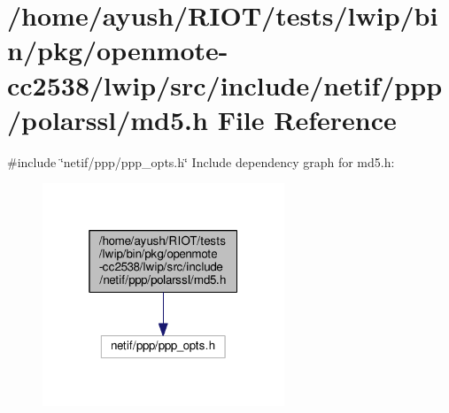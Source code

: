 \hypertarget{openmote-cc2538_2lwip_2src_2include_2netif_2ppp_2polarssl_2md5_8h}{}\section{/home/ayush/\+R\+I\+O\+T/tests/lwip/bin/pkg/openmote-\/cc2538/lwip/src/include/netif/ppp/polarssl/md5.h File Reference}
\label{openmote-cc2538_2lwip_2src_2include_2netif_2ppp_2polarssl_2md5_8h}
{\ttfamily \#include \char`\"{}netif/ppp/ppp\+\_\+opts.\+h\char`\"{}}\newline
Include dependency graph for md5.\+h\+:
\nopagebreak
\begin{figure}[H]
\begin{center}
\leavevmode
\includegraphics[width=205pt]{openmote-cc2538_2lwip_2src_2include_2netif_2ppp_2polarssl_2md5_8h__incl}
\end{center}
\end{figure}
